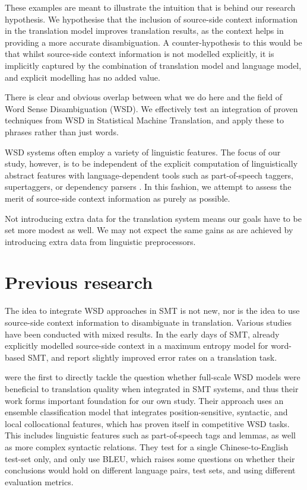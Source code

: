 \documentclass[smallextended]{svjour3}       %
\theoremstyle{break}
\begin{document}
These examples are meant to illustrate the intuition that is behind our
research hypothesis. We hypothesise that the inclusion of source-side context
information in the translation model improves translation results, as the
context helps in providing a more accurate disambiguation. A counter-hypothesis
to this would be that whilst source-side context information is not modelled
explicitly, it is implicitly captured by the combination of translation model
and language model, and explicit modelling has no added value.

There is clear and obvious overlap between what we do here and the field of
Word Sense Disambiguation (WSD). We effectively test an integration of proven
techniques from WSD in Statistical Machine Translation, and apply these to
phrases rather than just words.

WSD systems often employ a variety of linguistic features. The focus of our
study, however, is to be independent of the explicit computation of
linguistically abstract features with language-dependent tools such as
part-of-speech taggers, supertaggers, or dependency parsers
\cite{Rejwanul+11}. 
In this fashion, we attempt to assess the merit of source-side
context information as purely as possible.

Not introducing extra data for the translation system means our goals have to
be set more modest as well. We may not expect the same gains as are achieved by
introducing extra data from linguistic preprocessors.

\section{Previous research}

The idea to integrate WSD approaches in SMT is not new, nor is the idea to use
source-side context information to disambiguate in translation. Various studies
have been conducted with mixed results. In the early days of SMT,
\cite{GarciaVarea+02} already explicitly modelled source-side context in a
maximum entropy model for word-based SMT, and report slightly improved error
rates on a translation task.

\cite{CarpuatWu05} were the first to directly tackle the question whether
full-scale WSD models were beneficial to translation quality when integrated in
SMT systems, and thus their work forms important foundation for our own study.
Their approach uses an ensemble classification model that integrates
position-sensitive, syntactic, and local collocational features, which has
proven itself in competitive WSD tasks. This includes linguistic features such
as part-of-speech tags and lemmas, as well as more complex syntactic relations.
They test for a single Chinese-to-English test-set only, and only use BLEU,
which raises some questions on whether their conclusions would hold on
different language pairs, test sets, and using different evaluation metrics.
\end{document}
